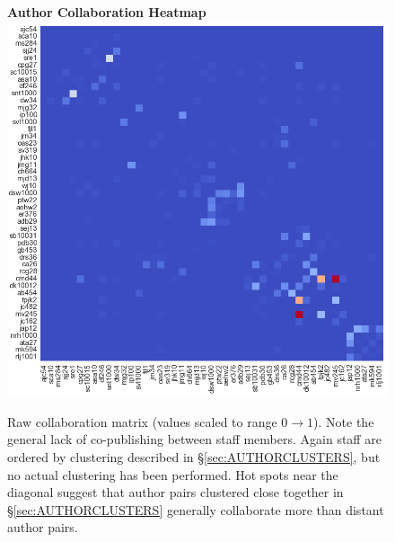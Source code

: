 \begin{figure}[H]
  \centering
  \textbf{Author Collaboration Heatmap}
    \includegraphics[width=\textwidth]{Analysis/raw_collabs.png}
    \caption[Author Collaboration Heatmap]{Raw collaboration matrix (values scaled to range $0 \rightarrow 1$). Note the general lack of co-publishing between staff members. Again staff are ordered by clustering described in \S\ref{sec:AUTHORCLUSTERS}, but no actual clustering has been performed. Hot spots near the diagonal suggest that author pairs clustered close together in \S\ref{sec:AUTHORCLUSTERS} generally collaborate more than distant author pairs.}
      \label{fig:rawcollabs}
  \end{figure}
